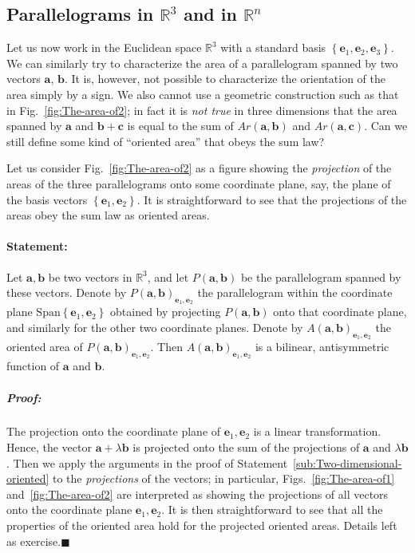 \subsection{Parallelograms in $\mathbb{R}^{3}$ and in $\mathbb{R}^{n}$ \label{sub:Area-of-two-dimensional-parallelograms}}

Let us now work in the Euclidean space $\mathbb{R}^{3}$ with a standard
basis $\left\{ \mathbf{e}_{1},\mathbf{e}_{2},\mathbf{e}_{3}\right\} $.
We can similarly try to characterize the area of a parallelogram spanned
by two vectors $\mathbf{a}$, $\mathbf{b}$. It is, however, not possible
to characterize the orientation of the area simply by a sign. We also
cannot use a geometric construction such as that in Fig.~\ref{fig:The-area-of2};
in fact it is \emph{not true} in three dimensions that the area spanned
by $\mathbf{a}$ and $\mathbf{b}+\mathbf{c}$ is equal to the sum
of $Ar(\mathbf{a},\mathbf{b})$ and $Ar(\mathbf{a},\mathbf{c})$.
Can we still define some kind of {}``oriented area'' that obeys
the sum law?

Let us consider Fig.~\ref{fig:The-area-of2} as a figure showing
the \emph{projection} of the areas of the three parallelograms onto
some coordinate plane, say, the plane of the basis vectors $\left\{ \mathbf{e}_{1},\mathbf{e}_{2}\right\} $.
It is straightforward to see that the projections of the areas obey
the sum law as oriented areas.


\paragraph{Statement:}

Let $\mathbf{a},\mathbf{b}$ be two vectors in $\mathbb{R}^{3}$,
and let $P(\mathbf{a},\mathbf{b})$ be the parallelogram spanned by
these vectors. Denote by $P(\mathbf{a},\mathbf{b})_{\mathbf{e}_{1},\mathbf{e}_{2}}$
the parallelogram within the coordinate plane $\text{Span}\left\{ \mathbf{e}_{1},\mathbf{e}_{2}\right\} $
obtained by projecting $P(\mathbf{a},\mathbf{b})$ onto that coordinate
plane, and similarly for the other two coordinate planes. Denote by
$A(\mathbf{a},\mathbf{b})_{\mathbf{e}_{1},\mathbf{e}_{2}}$ the oriented
area of $P(\mathbf{a},\mathbf{b})_{\mathbf{e}_{1},\mathbf{e}_{2}}$.
Then $A(\mathbf{a},\mathbf{b})_{\mathbf{e}_{1},\mathbf{e}_{2}}$ is
a bilinear, antisymmetric function of $\mathbf{a}$ and $\mathbf{b}$.


\subparagraph{Proof:}

The projection onto the coordinate plane of $\mathbf{e}_{1},\mathbf{e}_{2}$
is a linear transformation. Hence, the vector $\mathbf{a}+\lambda\mathbf{b}$
is projected onto the sum of the projections of $\mathbf{a}$ and
$\lambda\mathbf{b}$. Then we apply the arguments in the proof of
Statement~\ref{sub:Two-dimensional-oriented} to the \emph{projections}
of the vectors; in particular, Figs.~\ref{fig:The-area-of1} and~\ref{fig:The-area-of2}
are interpreted as showing the projections of all vectors onto the
coordinate plane $\mathbf{e}_{1},\mathbf{e}_{2}$. It is then straightforward
to see that all the properties of the oriented area hold for the projected
oriented areas. Details left as exercise.\hfill{}$\blacksquare$

